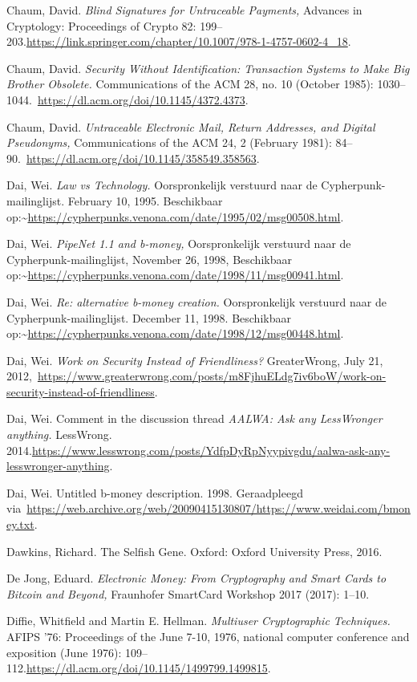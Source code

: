 \documentclass[smalldemyvopaper,11pt,twoside,onecolumn,openright,extrafontsizes,hidelinks]{memoir}
\begin{document}
Chaum, David. \emph{Blind Signatures for Untraceable Payments,} Advances
in Cryptology: Proceedings of Crypto 82:
199--203.\href{https://doi.org/10.1007/978-1-4757-0602-4_18}{https://link.springer.com/chapter/10.1007/978-1-4757-0602-4\_18}.

Chaum, David. \emph{Security Without Identification: Transaction Systems
to Make Big Brother Obsolete.} Communications of the ACM 28, no. 10
(October 1985):
1030--1044.~\url{https://dl.acm.org/doi/10.1145/4372.4373}.

Chaum, David. \emph{Untraceable Electronic Mail, Return Addresses, and
Digital Pseudonyms,} Communications of the ACM 24, 2 (February 1981):
84--90.~\url{https://dl.acm.org/doi/10.1145/358549.358563}.

Dai, Wei. \emph{Law vs Technology.} Oorspronkelijk verstuurd naar de
Cypherpunk-mailinglijst. February 10, 1995. Beschikbaar
op:\textasciitilde{}\url{https://cypherpunks.venona.com/date/1995/02/msg00508.html}.

Dai, Wei. \emph{PipeNet 1.1 and b-money,} Oorspronkelijk verstuurd naar
de Cypherpunk-mailinglijst, November 26, 1998, Beschikbaar
op:\textasciitilde{}\url{https://cypherpunks.venona.com/date/1998/11/msg00941.html}.

Dai, Wei. \emph{Re: alternative b-money creation.} Oorspronkelijk
verstuurd naar de Cypherpunk-mailinglijst. December 11, 1998.
Beschikbaar
op:\textasciitilde{}\url{https://cypherpunks.venona.com/date/1998/12/msg00448.html}.

Dai, Wei. \emph{Work on Security Instead of Friendliness?} GreaterWrong,
July 21,
2012,~\url{https://www.greaterwrong.com/posts/m8FjhuELdg7iv6boW/work-on-security-instead-of-friendliness}.

Dai, Wei. Comment in the discussion thread \emph{AALWA: Ask any
LessWronger anything.} LessWrong.
2014.\url{https://www.lesswrong.com/posts/YdfpDyRpNyypivgdu/aalwa-ask-any-lesswronger-anything}.

Dai, Wei. Untitled b-money description. 1998. Geraadpleegd
via~\href{https://web.archive.org/web/20090415130807/https:/www.weidai.com/bmoney.txt}{https://web.archive.org/web/20090415130807/https://www.weidai.com/bmoney.txt}.

Dawkins, Richard. The Selfish Gene. Oxford: Oxford University Press,
2016.

De Jong, Eduard. \emph{Electronic Money: From Cryptography and Smart
Cards to Bitcoin and Beyond,} Fraunhofer SmartCard Workshop 2017 (2017):
1--10.

Diffie, Whitfield and Martin E. Hellman. \emph{Multiuser Cryptographic
Techniques.} AFIPS '76: Proceedings of the June 7-10, 1976, national
computer conference and exposition (June 1976):
109--112.\url{https://dl.acm.org/doi/10.1145/1499799.1499815}.
\end{document}
